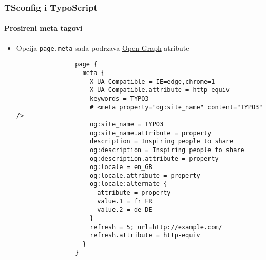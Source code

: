 \begin{frame}[fragile]
	\frametitle{TSconfig i TypoScript}
	\framesubtitle{Prosireni meta tagovi}

	\lstset{basicstyle=\tiny\ttfamily}

	\begin{itemize}


		\item Opcija \texttt{page.meta} sada podrzava \href{http://ogp.me}{Open Graph} atribute

			\begin{lstlisting}
				page {
				  meta {
				    X-UA-Compatible = IE=edge,chrome=1
				    X-UA-Compatible.attribute = http-equiv
				    keywords = TYPO3
				    # <meta property="og:site_name" content="TYPO3" />
				    og:site_name = TYPO3
				    og:site_name.attribute = property
				    description = Inspiring people to share
				    og:description = Inspiring people to share
				    og:description.attribute = property
				    og:locale = en_GB
				    og:locale.attribute = property
				    og:locale:alternate {
				      attribute = property
				      value.1 = fr_FR
				      value.2 = de_DE
				    }
				    refresh = 5; url=http://example.com/
				    refresh.attribute = http-equiv
				  }
				}
			\end{lstlisting}

	\end{itemize}

\end{frame}


